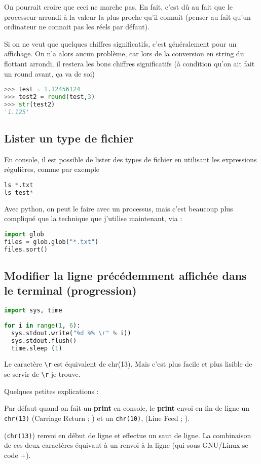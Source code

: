 \documentclass[a4paper,twoside]{article}
\begin{document}
On pourrait croire que ceci ne marche pas. En fait, c'est dû au fait que le processeur arrondi à la valeur la plus proche qu'il connait (penser au fait qu'un ordinateur ne connait pas les réels par défaut).

Si on ne veut que quelques chiffres significatifs, c'est généralement pour un affichage. On n'a alors aucun problème, car lors de la conversion en string du flottant arrondi, il restera les bons chiffres significatifs (à condition qu'on ait fait un round avant, ça va de soi)
\begin{lstlisting}[language=python]
>>> test = 1.12456124
>>> test2 = round(test,3)
>>> str(test2)
'1.125'
\end{lstlisting}

\subsection{Lister un type de fichier}
En console, il est possible de lister des types de fichier en utilisant les expressions régulières, comme par exemple
\begin{lstlisting}[language=python]
ls *.txt
ls test*
\end{lstlisting}

Avec python, on peut le faire avec un processus, mais c'est beaucoup plus compliqué que la technique que j'utilise maintenant, via  : 
\begin{lstlisting}[language=python]
import glob
files = glob.glob("*.txt")
files.sort()
\end{lstlisting}

\subsection{Modifier la ligne précédemment affichée dans le terminal (progression)}	
\begin{lstlisting}[language=python]
import sys, time
 
for i in range(1, 6):
  sys.stdout.write("%d %% \r" % i))
  sys.stdout.flush()
  time.sleep (1)
\end{lstlisting}

Le caractère \verb|\r| est équivalent de chr(13). Mais c'est plus facile et plus lisible de se servir de \verb|\r| je trouve.

\begin{remarque}
Quelques petites explications :

Par défaut quand on fait un \textbf{print} en console, le \textbf{print} envoi en fin de ligne un \texttt{chr(13)} (Carriage Return ; ) et un \texttt{chr(10)}, (Line Feed ; ).

 (\texttt{chr(13)}) renvoi en début de ligne et  effectue un saut de ligne. La combinaison de ces deux caractères équivaut à un renvoi à la ligne (qui sous GNU/Linux se code +).
\end{remarque}
\end{document}
